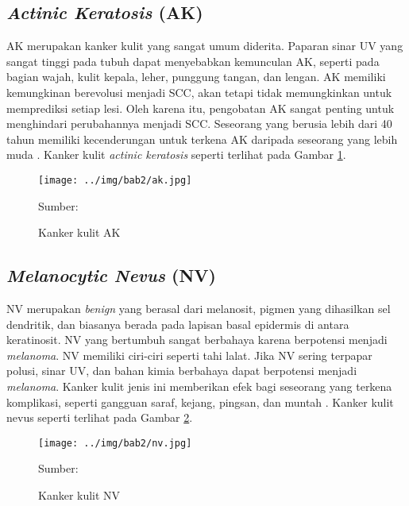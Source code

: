     \subsection{\textit{Actinic Keratosis} (AK)}
    AK merupakan kanker kulit yang sangat umum diderita. Paparan sinar UV yang sangat tinggi pada tubuh dapat menyebabkan kemunculan AK, seperti pada bagian wajah, kulit kepala, leher, punggung tangan, dan lengan. AK memiliki kemungkinan berevolusi menjadi SCC, akan tetapi tidak memungkinkan untuk memprediksi setiap lesi. Oleh karena itu, pengobatan AK sangat penting untuk menghindari perubahannya menjadi SCC. Seseorang yang berusia lebih dari 40 tahun memiliki kecenderungan untuk terkena AK daripada seseorang yang lebih muda \citep{Dianzani2020}. Kanker kulit \textit{actinic keratosis} seperti terlihat pada Gambar \ref{fig:ak}.
    \begin{figure}[H] 
        \begin{center} 
            \texttt{[image: ../img/bab2/ak.jpg]}
            \caption{Kanker kulit AK} 
            \label{fig:ak}
            Sumber: \citep{Codella2018,Combalia2019,Tschandl2018}
        \end{center} 
    \end{figure}

    \subsection{\textit{Melanocytic Nevus} (NV)}
    NV merupakan \textit{benign} yang berasal dari melanosit, pigmen yang dihasilkan sel dendritik, dan biasanya berada pada lapisan basal epidermis di antara keratinosit. NV yang bertumbuh sangat berbahaya karena berpotensi menjadi \textit{melanoma}. NV memiliki ciri-ciri seperti tahi lalat. Jika NV sering terpapar polusi, sinar UV, dan bahan kimia berbahaya dapat berpotensi menjadi \textit{melanoma}. Kanker kulit jenis ini memberikan efek bagi seseorang yang terkena komplikasi, seperti gangguan saraf, kejang, pingsan, dan muntah \citep{Fuadah2020a}. Kanker kulit nevus seperti terlihat pada Gambar \ref{fig:nv}.
    \begin{figure}[H] 
        \begin{center} 
            \texttt{[image: ../img/bab2/nv.jpg]}
            \caption{Kanker kulit NV} 
            \label{fig:nv}
            Sumber: \citep{Codella2018,Combalia2019,Tschandl2018}
        \end{center} 
    \end{figure}


